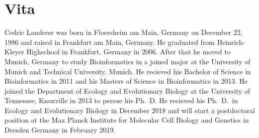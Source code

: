 \chapter*{Vita} \label{ch:vita}
Cedric Landerer was born in Floersheim am Main, Germany on December 22, 1986 and raised in Frankfurt am Main, Germany.
He graduated from Heinrich-Kleyer Highschool in Frankfurt, Germany in 2006.
After that he moved to Munich, Germany to study Bioinformatics in a joined major at the University of Munich and Technical University, Munich.
He recieved his Bachelor of Science in Bioinformatics in 2011 and his Masters of Science in Bioinformatics in 2013.
He joined the Department of Ecology and Evolutionary Biology at the University of Tennessee, Knoxville in 2013 to persue his Ph.~D. 
He recieved his Ph.~D.~in Ecology and Evolutionary Biology in December 2018 and will start a postdoctoral position at the Max Planck Institute for Molecular Cell Biology and Genetics in Dresden Germany in February 2019.